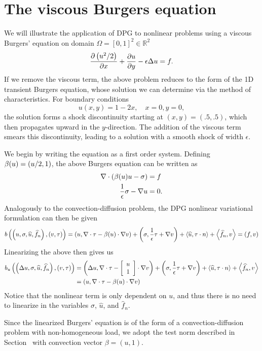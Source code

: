 \section{The viscous Burgers equation}

We will illustrate the application of DPG to nonlinear problems using a viscous Burgers' equation on domain $\Omega = [0,1]^2 \in \mathbb{R}^2$ \cite{MITDPG}
\[
\pd{\left(u^2/2\right)}{x} + \pd{u}{y} - \epsilon \Delta u = f.
\]
If we remove the viscous term, the above problem reduces to the form of the 1D transient Burgers equation, whose solution we can determine via the method of characteristics.  For boundary conditions 
\[
u(x,y) = 1-2x, \quad x = 0, y = 0,
\]
the solution forms a shock discontinuity starting at $(x,y) = (.5,.5)$, which then propagates upward in the $y$-direction.  The addition of the viscous term smears this discontinuity, leading to a solution with a smooth shock of width $\epsilon$.  

We begin by writing the equation as a first order system.  Defining $\beta(u) = \LRp{u/2,1}$, the above Burgers equation can be written as 
\begin{align*}
\div\left(\beta(u)u-\sigma\right) &=f \\
\frac{1}{\epsilon}\sigma - \grad u &=0.
\end{align*}
Analogously to the convection-diffusion problem, the DPG nonlinear variational formulation can then be given
\[
b\left(\left(u,\sigma,\widehat{u},\widehat{f}_n\right),\left(v,\tau\right)\right) = \LRp{u,\div \tau - \beta(u) \cdot \grad v} + \LRp{\sigma, \frac{1}{\epsilon}\tau + \grad v} + \LRa{\widehat{u},\tau\cdot n} + \LRa{\widehat{f}_n,v} = \LRp{f,v}
\]
Linearizing the above then gives us 
\begin{align*}
b_u\left(\left(\Delta u,\sigma,\widehat{u},\widehat{f}_n\right),\left(v,\tau\right)\right) &= \LRp{\Delta u,\div \tau - \vecttwo{u}{1} \cdot \grad v} + \LRp{\sigma, \frac{1}{\epsilon}\tau + \grad v} + \LRa{\widehat{u},\tau\cdot n} + \LRa{\widehat{f}_n,v} \\
&= \LRp{u,\div \tau - \beta(u)\cdot \grad v} 
\end{align*}
Notice that the nonlinear term is only dependent on $u$, and thus there is no need to linearize in the variables $\sigma$, $\widehat{u}$, and $\widehat{f}_n$.  

Since the linearized Burgers' equation is of the form of a convection-diffusion problem with non-homogeneous load, we adopt the test norm described in Section~ with convection vector $\beta = (u,1)$.  

